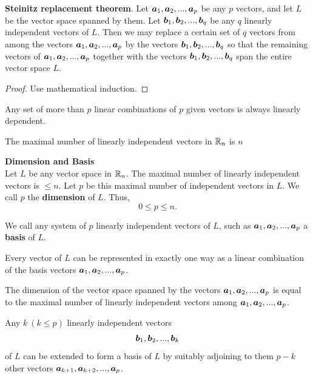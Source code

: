 \begin{theorem} {\bf Steinitz replacement theorem}. Let $\boldsymbol{a}_1, \boldsymbol{a}_2, ..., \boldsymbol{a}_p$ be any $p$ vectors, and let $L$ be the vector space spanned by them. Let $\boldsymbol{b}_1, \boldsymbol{b}_2, ..., \boldsymbol{b}_q$ be any $q$ linearly independent vectors of 
$L$. Then we may replace a certain set of $q$ vectors from among the vectors $\boldsymbol{a}_1, \boldsymbol{a}_2, ..., \boldsymbol{a}_p$ by the vectors $\boldsymbol{b}_1, \boldsymbol{b}_2, ...,\boldsymbol{b}_q$ so that the remaining vectors of $\boldsymbol{a}_1, \boldsymbol{a}_2, ..., \boldsymbol{a}_p$ together with the vectors $\boldsymbol{b}_1, \boldsymbol{b}_2, ..., \boldsymbol{b}_q$ span the entire vector space $L$.\label{Th2_1}
\end{theorem}

\begin{proof}
Use mathematical induction.
\end{proof}

\begin{theorem}
Any set of more than $p$ linear combinations of $p$ given vectors is always linearly dependent.\label{Th2_2}
\end{theorem}

\begin{theorem}
The maximal number of linearly independent vectors in $\mathbb{R}_n$ is $n$\label{Th2_3}
\end{theorem}

\begin{definition}{\bf Dimension and Basis}\\
Let $L$ be any vector space in $\mathbb{R}_n$. The maximal number of linearly independent vectors is $\le n$. Let $p$ be this maximal number of independent vectors in $L$. We call $p$ the {\bf dimension} of $L$. Thus,
$$0 \le p \le n.$$

We call any system of $p$ linearly independent vectors of $L$, such as $\boldsymbol{a}_1, \boldsymbol{a}_2, ..., \boldsymbol{a}_p$ a {\bf basis} of $L$.
\end{definition}

\begin{theorem}
Every vector of $L$ can be represented in exactly one way as a linear combination of the basis vectors $\boldsymbol{a}_1, \boldsymbol{a}_2, ..., \boldsymbol{a}_p$.\label{Th2_4}
\end{theorem}

\begin{theorem}
The dimension of the vector space spanned by the vectors $\boldsymbol{a}_1, \boldsymbol{a}_2, ...,\boldsymbol{a}_p$ is equal to the maximal number of linearly independent vectors among $\boldsymbol{a}_1, \boldsymbol{a}_2, ..., \boldsymbol{a}_p$.\label{Th2_5}
\end{theorem}

\begin{theorem}
Any $k ~ (k\le p)$ linearly independent vectors $$\boldsymbol{b}_1, \boldsymbol{b}_2, ..., \boldsymbol{b}_k$$
 of $L$ can be extended to form a basis of $L$ by suitably adjoining to them $p-k$ other vectors $\boldsymbol{a}_{k+1}, \boldsymbol{a}_{k+2}, ..., \boldsymbol{a}_p$.\label{Th2_6}
\end{theorem}

